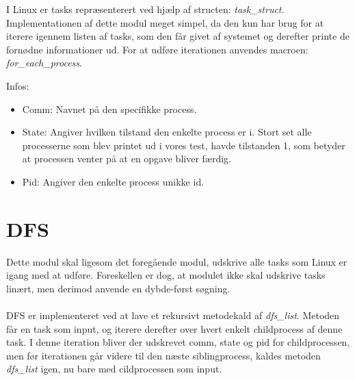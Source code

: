 I Linux er tasks repræsenterert ved hjælp af structen: \textit{task\_struct}. Implementationen af dette modul meget simpel, da den kun har brug for at iterere igennem listen af tasks, som den får givet af systemet og derefter printe de fornødne informationer ud. For at udføre iterationen anvendes macroen: \textit{for\_each\_process}.

Infos:
\begin{itemize}
\item Comm: Navnet på den specifikke process.
\item State: Angiver hvilken tilstand den enkelte process er i. Stort set alle processerne som blev printet ud i vores test, havde tilstanden 1, som betyder at processen venter på at en opgave bliver færdig.
\item Pid: Angiver den enkelte process unikke id.  
\end{itemize}

\section{DFS}
Dette modul skal ligesom det foregående modul, udskrive alle tasks som Linux er igang med at udføre. Foreskellen er dog, at modulet ikke skal udskrive tasks linært, men derimod anvende en dybde-først søgning.\\
\\
DFS er implementeret ved at lave et rekursivt metodekald af \textit{dfs\_list}. Metoden får en task som input, og iterere derefter over hvert enkelt childprocess af denne task. I denne iteration bliver der udskrevet comm, state og pid for childprocessen, men før iterationen går videre til den næste siblingprocess, kaldes metoden \textit{dfs\_list} igen, nu bare med cildprocessen som input.

